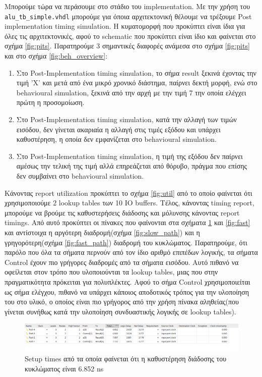 \documentclass[11pt, a4paper]{report}
\begin{document}
Μπορούμε τώρα να περάσουμε στο στάδιο του implementation. Με την χρήση του \texttt{alu_tb_simple.vhdl} μπορούμε για όποια αρχιτεκτονική θέλουμε να τρέξουμε Post implementation timing simulation.
Η κυματομορφή που προκύπτει είναι ίδια για όλες τις αρχιτεκτονικές, αφού το schematic που προκύπτει είναι ίδιο και φαίνεται στο σχήμα \ref{fig:pits}. 
Παρατηρούμε 3 σημαντικές διαφορές ανάμεσα στο σχήμα \ref{fig:pits} και στο σχήμα \ref{fig:beh_overview}:
\begin{enumerate}
  \item Στο Post-Implementation timing simulation, το σήμα result ξεκινά έχοντας την τιμή 'X' και μετά από ένα μικρό χρονικό διάστημα, παίρνει δεκτή μορφή, ενώ στο behavioural simulation, ξεκινά από την αρχή με την τιμή 7 την οποία ελέγχει πρώτη η προσομοίωση.
  \item Στο Post-Implementation timing simulation, κατά την αλλαγή των τιμών εισόδου, δεν γίνεται ακαριαία η αλλαγή στις τιμές εξόδου και υπάρχει καθυστέρηση, η οποία δεν εμφανίζεται στο behavioural simulation.
  \item Στο Post-Implementation timing simulation, η τιμή της εξόδου δεν παίρνει αμέσως την τελική της τιμή αλλά επηρεάζεται από θόρυβο, πράγμα που επίσης δεν συμβαίνει στο behavioural simulation.
\end{enumerate}

Κάνοντας report utilization  προκύπτει το σχήμα \ref{fig:util} από το οποίο φαίνεται ότι χρησιμοποιούμε 2 lookup tables των 10 IO buffers.
Τέλος, κάνοντας timing report, μπορούμε να βρούμε τις καθυστερήσεις διάδοσης και μόλυνσης κάνοντας report timings.
Από αυτό προκύπτει οι πίνακες που φαίνονται στα σχήματα \ref{fig:slow} και \ref{fig:fast} και αντίστοιχα η αργότερη διαδρομή(σχήμα \ref{fig:slow_path}) και η γρηγορότερη(σχήμα \ref{fig:fast_path}) διαδρομή του κυκλώματος.
Παρατηρούμε, ότι παρόλο που όλα τα σήματα περνούν από τον ίδιο αριθμό επιπέδων λογικής, τα σήματα Control έχουν πιο γρήγορες διαδρομές από τα σήματα εισόδου.
Αυτό πιθανό να οφείλεται στον τρόπο που υλοποιούνται τα lookup tables, μιας που στην πραγματικότητα πρόκειται για πολυπλέκτες. Αφού το σήμα Control χρησιμοποιείται ως σήμα ελέγχου, πιθανό να υπάρχει κάποιος αποδοτικός τρόπος για την υλοποίηση του στο υλικό, ο οποίος είναι πιο γρήγορος από την χρήση πίνακα αληθείας(που γίνεται συνήθως κατά την υλοποίηση συνδυαστικής λογικής σε lookup tables).

\begin{figure}
  \includegraphics[width=\textwidth]{./images/alu-2/slow-report.png}
  \caption{Setup times από τα οποία φαίνεται ότι η καθυστέρηση διάδοσης του κυκλώματος είναι 6.852 ns}
  \label{fig:slow}
\end{figure}
\end{document}
